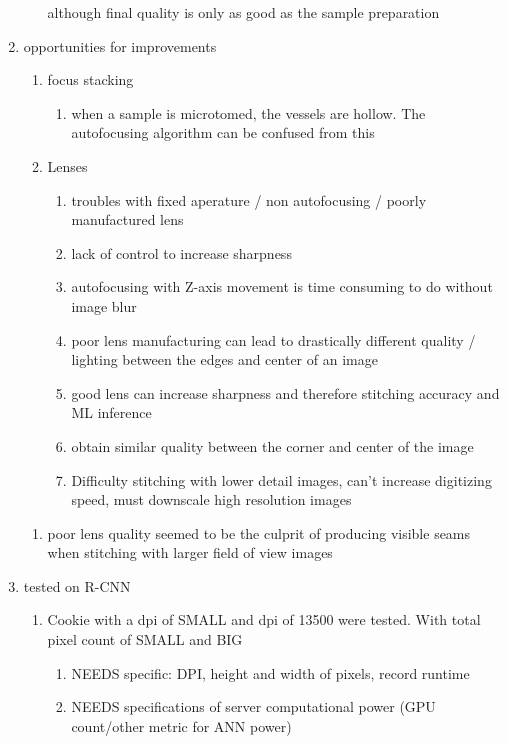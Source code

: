 \documentclass{article}
\begin{document}
\begin{outline}[enumerate]
\begin{enumerate}
\begin{enumerate}
		\subitem although final quality is only as good as the sample preparation
		\end{enumerate}
	\item opportunities for improvements
		\begin{enumerate}
		\item focus stacking
			\begin {enumerate}
			\item when a sample is microtomed, the vessels are hollow. The autofocusing algorithm can be confused from this 
			\end{enumerate}
			\item Lenses
			\begin{enumerate}
				\item troubles with fixed aperature / non autofocusing / poorly manufactured lens
				\item lack of control to increase sharpness
				\item autofocusing with Z-axis movement is time consuming to do without image blur
				\item poor lens manufacturing can lead to drastically different quality / lighting between the edges and center of an image
				\item good lens can increase sharpness and therefore stitching accuracy and ML inference
				\item obtain similar quality between the corner and center of the image
				\item Difficulty stitching with lower detail images, can't increase digitizing speed, must downscale high resolution images 
				\end{enumerate}
		\end{enumerate}
		\begin{enumerate}
		\item poor lens quality seemed to be the culprit of producing visible seams when stitching with larger field of view images 
		\end{enumerate}
	\item tested on R-CNN
		\begin{enumerate}
		\item Cookie with a dpi of SMALL and dpi of 13500 were tested. With total pixel count of SMALL and BIG
			\begin{enumerate}
			\item NEEDS specific: DPI, height and width of pixels, record runtime
			\item NEEDS specifications of server computational power (GPU count/other metric for ANN power)

\end{enumerate}
\end{enumerate}
\end{enumerate}
\end{outline}
\end{document}
